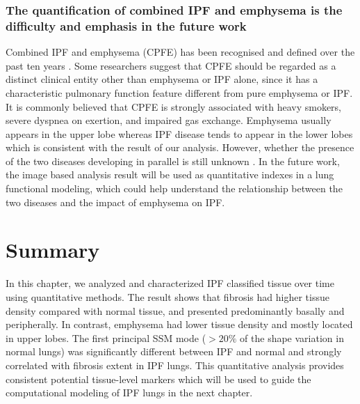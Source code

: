 \subsubsection{The quantification of combined IPF and emphysema is the difficulty and emphasis in the future work}
Combined IPF and emphysema (CPFE) has been recognised and defined over the past ten years \citep{cottin2005combined,meltzer2008idiopathic}. Some researchers suggest that CPFE should be regarded as a distinct clinical entity other than emphysema or IPF alone, since it has a characteristic pulmonary function feature different from pure emphysema or IPF. It is commonly believed that CPFE is strongly associated with heavy smokers, severe dyspnea on exertion, and impaired gas exchange. Emphysema usually appears in the upper lobe whereas IPF disease tends to appear in the lower lobes \citep{lin2015combined} which is consistent with the result of our analysis. However, whether the presence of the two diseases developing in parallel is still unknown \citep{cottin2005combined, king2011idiopathic, lin2015combined}. In the future work, the image based analysis result will be used as quantitative indexes in a lung functional modeling, which could help understand the relationship between the two diseases and the impact of emphysema on IPF.

\section{Summary}
In this chapter, we analyzed and characterized IPF classified tissue over time using quantitative methods. The result shows that fibrosis had higher tissue density compared with normal tissue, and presented predominantly basally and peripherally. In contrast, emphysema had lower tissue density and mostly located in upper lobes. The first principal SSM mode ($>20\%$ of the shape variation in normal lungs) was significantly different between IPF and normal and strongly correlated with fibrosis extent in IPF lungs. This quantitative analysis provides consistent potential tissue-level markers which will be used to guide the computational modeling of IPF lungs in the next chapter.